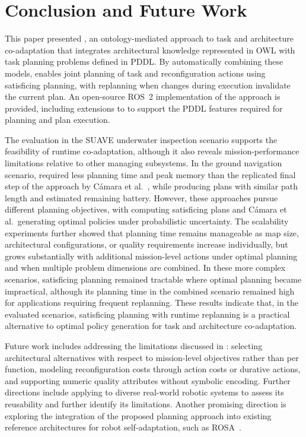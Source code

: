 \section{Conclusion and Future Work}\label{planta:sec:conclusion}

This paper presented \planta, an ontology-mediated approach to task and architecture co-adaptation that integrates architectural knowledge represented in OWL with task planning problems defined in PDDL\@. By automatically combining these models, \planta enables joint planning of task and reconfiguration actions using satisficing planning, with replanning when changes during execution invalidate the current plan. An open-source ROS~2 implementation of the approach is provided, including extensions to \plansys to support the PDDL features required for planning and plan execution.

The evaluation in the SUAVE underwater inspection scenario supports the feasibility of runtime co-adaptation, although it also reveals mission-performance limitations relative to other managing subsystems. In the ground navigation scenario, \planta required less planning time and peak memory than the replicated final step of the approach by Cámara et al.~\cite{CAMARASoftwareArchitectureTask2020}, while producing plans with similar path length and estimated remaining battery. However, these approaches pursue different planning objectives, with \planta computing satisficing plans and Cámara et al.\ generating optimal policies under probabilistic uncertainty. The scalability experiments further showed that planning time remains manageable as map size, architectural configurations, or quality requirements increase individually, but grows substantially with additional mission-level actions under optimal planning and when multiple problem dimensions are combined. In these more complex scenarios, satisficing planning remained tractable where optimal planning became impractical, although its planning time in the combined scenario remained high for applications requiring frequent replanning. These results indicate that, in the evaluated scenarios, satisficing planning with runtime replanning is a practical alternative to optimal policy generation for task and architecture co-adaptation.

Future work includes addressing the limitations discussed in : selecting architectural alternatives with respect to mission-level objectives rather than per function, modeling reconfiguration costs through action costs or durative actions, and supporting numeric quality attributes without symbolic encoding. Further directions include applying \planta to diverse real-world robotic systems to assess its reusability and further identify its limitations. Another promising direction is exploring the integration of the proposed planning approach into existing reference architectures for robot self-adaptation, such as ROSA~\cite{rosa}.

